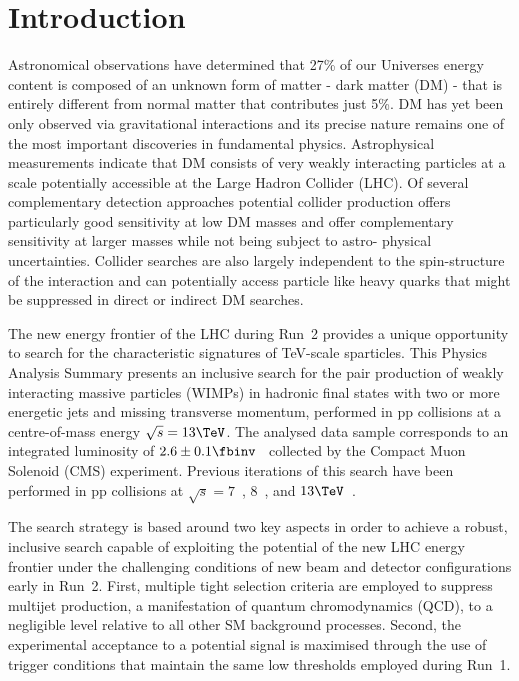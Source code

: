 \section{Introduction}
\label{sec:introduction}

Astronomical observations have determined that 27\% of our Universes
energy content is composed of an unknown form of matter - dark matter
(DM) - that is entirely different from normal matter that contributes
just 5\%. DM has yet been only observed via gravitational interactions
and its precise nature remains one of the most important discoveries
in fundamental physics.  Astrophysical measurements indicate that DM
consists of very weakly interacting particles at a scale potentially
accessible at the Large Hadron Collider (LHC). Of several
complementary detection approaches potential collider production
offers particularly good sensitivity at low DM masses and offer
complementary sensitivity at larger masses while not being subject to
astro- physical uncertainties. Collider searches are also largely
independent to the spin-structure of the interaction and can
potentially access particle like heavy quarks that might be suppressed
in direct or indirect DM searches.

The new energy frontier of the LHC during Run~2 provides a unique
opportunity to search for the characteristic signatures of TeV-scale
sparticles. This Physics Analysis Summary presents an inclusive search
for the pair production of weakly interacting massive particles
(WIMPs) in hadronic final states with two or more energetic jets and
missing transverse momentum, performed in pp collisions at a
centre-of-mass energy $\sqrt{s} = 13\TeV$. The analysed data sample
corresponds to an integrated luminosity of $2.6 \pm 0.1
\fbinv$~\cite{lumi} collected by the Compact Muon Solenoid (CMS)
experiment. Previous iterations of this search have been performed in
pp collisions at $\sqrt{s} = 7$~\cite{RA1Paper, RA1Paper2011,
  RA1Paper2011FULL}, $8$~\cite{RA1Paper2012, RA1Parked}, and
$13\TeV$~\cite{RA1Paper2015}.

The search strategy is based around two key aspects in order to
achieve a robust, inclusive search capable of exploiting the potential
of the new LHC energy frontier under the challenging conditions of new
beam and detector configurations early in Run~2. First, multiple tight
selection criteria are employed to suppress multijet production, a
manifestation of quantum chromodynamics (QCD), to a negligible level
relative to all other SM background processes. Second, the
experimental acceptance to a potential signal is maximised through the
use of trigger conditions that maintain the same low thresholds
employed during Run~1.

